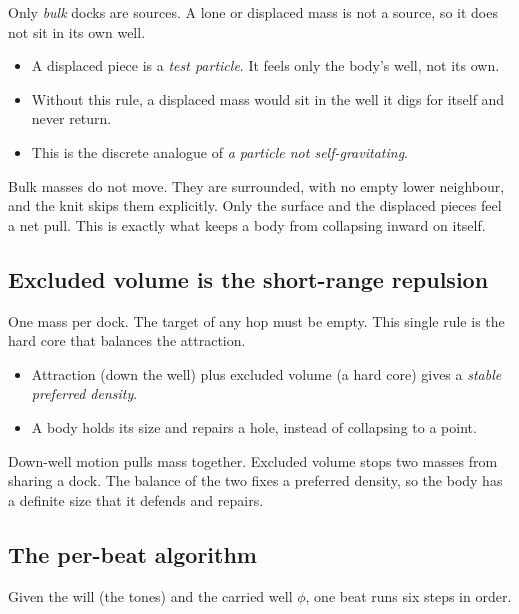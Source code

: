 Only \emph{bulk} docks are sources. A lone or displaced mass is not a source, so it does not sit in its own well.

\begin{itemize}
\item A displaced piece is a \emph{test particle}. It feels only the body's well, not its own.
\item Without this rule, a displaced mass would sit in the well it digs for itself and never return.
\item This is the discrete analogue of \emph{a particle not self-gravitating}.
\end{itemize}

Bulk masses do not move. They are surrounded, with no empty lower neighbour, and the knit skips them explicitly. Only the surface and the displaced pieces feel a net pull. This is exactly what keeps a body from collapsing inward on itself.

\subsection{Excluded volume is the short-range repulsion}

One mass per dock. The target of any hop must be empty. This single rule is the hard core that balances the attraction.

\begin{itemize}
\item Attraction (down the well) plus excluded volume (a hard core) gives a \emph{stable preferred density}.
\item A body holds its size and repairs a hole, instead of collapsing to a point.
\end{itemize}

\begin{principle}
Down-well motion pulls mass together. Excluded volume stops two masses from sharing a dock. The balance of the two fixes a preferred density, so the body has a definite size that it defends and repairs.
\end{principle}

\subsection{The per-beat algorithm}

Given the will (the tones) and the carried well $\phi$, one beat runs six steps in order.

